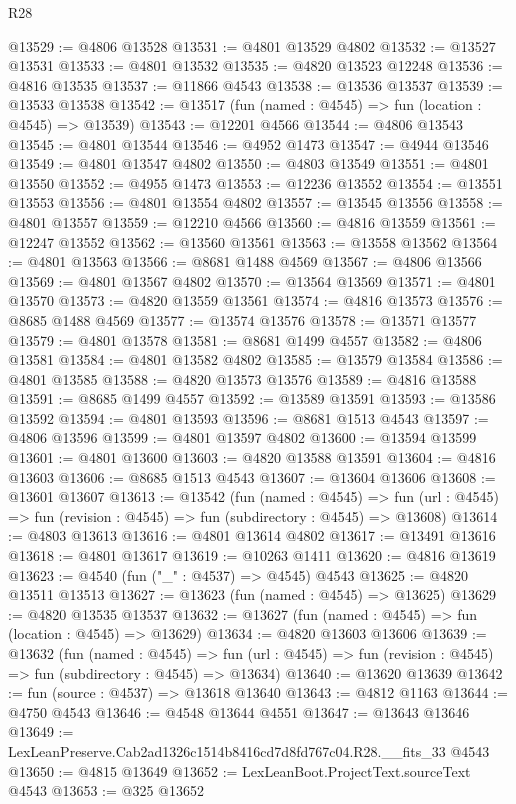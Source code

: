 \begin{lexlean}{R28}
\begin{coremodule}
@13529 := @4806 @13528
@13531 := @4801 @13529 @4802
@13532 := @13527 @13531
@13533 := @4801 @13532
@13535 := @4820 @13523 @12248
@13536 := @4816 @13535
@13537 := @11866 @4543
@13538 := @13536 @13537
@13539 := @13533 @13538
@13542 := @13517 (fun (named : @4545) => fun (location : @4545) => @13539)
@13543 := @12201 @4566
@13544 := @4806 @13543
@13545 := @4801 @13544
@13546 := @4952 @1473
@13547 := @4944 @13546
@13549 := @4801 @13547 @4802
@13550 := @4803 @13549
@13551 := @4801 @13550
@13552 := @4955 @1473
@13553 := @12236 @13552
@13554 := @13551 @13553
@13556 := @4801 @13554 @4802
@13557 := @13545 @13556
@13558 := @4801 @13557
@13559 := @12210 @4566
@13560 := @4816 @13559
@13561 := @12247 @13552
@13562 := @13560 @13561
@13563 := @13558 @13562
@13564 := @4801 @13563
@13566 := @8681 @1488 @4569
@13567 := @4806 @13566
@13569 := @4801 @13567 @4802
@13570 := @13564 @13569
@13571 := @4801 @13570
@13573 := @4820 @13559 @13561
@13574 := @4816 @13573
@13576 := @8685 @1488 @4569
@13577 := @13574 @13576
@13578 := @13571 @13577
@13579 := @4801 @13578
@13581 := @8681 @1499 @4557
@13582 := @4806 @13581
@13584 := @4801 @13582 @4802
@13585 := @13579 @13584
@13586 := @4801 @13585
@13588 := @4820 @13573 @13576
@13589 := @4816 @13588
@13591 := @8685 @1499 @4557
@13592 := @13589 @13591
@13593 := @13586 @13592
@13594 := @4801 @13593
@13596 := @8681 @1513 @4543
@13597 := @4806 @13596
@13599 := @4801 @13597 @4802
@13600 := @13594 @13599
@13601 := @4801 @13600
@13603 := @4820 @13588 @13591
@13604 := @4816 @13603
@13606 := @8685 @1513 @4543
@13607 := @13604 @13606
@13608 := @13601 @13607
@13613 := @13542
    (fun (named : @4545) =>
    fun (url : @4545) => fun (revision : @4545) => fun (subdirectory : @4545) => @13608)
@13614 := @4803 @13613
@13616 := @4801 @13614 @4802
@13617 := @13491 @13616
@13618 := @4801 @13617
@13619 := @10263 @1411
@13620 := @4816 @13619
@13623 := @4540 (fun ("_" : @4537) => @4545) @4543
@13625 := @4820 @13511 @13513
@13627 := @13623 (fun (named : @4545) => @13625)
@13629 := @4820 @13535 @13537
@13632 := @13627 (fun (named : @4545) => fun (location : @4545) => @13629)
@13634 := @4820 @13603 @13606
@13639 := @13632
    (fun (named : @4545) =>
    fun (url : @4545) => fun (revision : @4545) => fun (subdirectory : @4545) => @13634)
@13640 := @13620 @13639
@13642 := fun (source : @4537) => @13618 @13640
@13643 := @4812 @1163
@13644 := @4750 @4543
@13646 := @4548 @13644 @4551
@13647 := @13643 @13646
@13649 := LexLeanPreserve.Cab2ad1326c1514b8416cd7d8fd767c04.R28.__fits_33 @4543
@13650 := @4815 @13649
@13652 := LexLeanBoot.ProjectText.sourceText @4543
@13653 := @325 @13652

\end{coremodule}
\end{lexlean}
